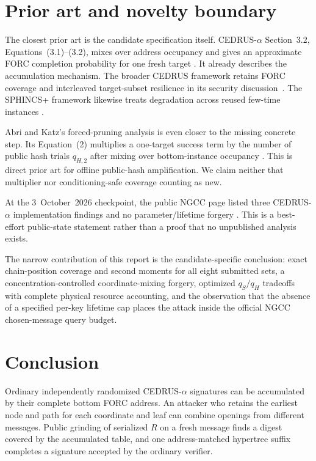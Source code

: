 \documentclass[11pt,a4paper]{article}
\begin{document}
\section{Prior art and novelty boundary}

The closest prior art is the candidate specification itself.  CEDRUS-$\alpha$
Section~3.2, Equations~(3.1)--(3.2), mixes over address occupancy and gives an
approximate FORC completion probability for one fresh target
\cite{cedrus-spec}.  It already describes the accumulation mechanism.  The
broader CEDRUS framework retains FORC coverage and interleaved target-subset
resilience in its security discussion~\cite{cedrus-framework}.  The SPHINCS+
framework likewise treats degradation across reused few-time instances
\cite{sphincs-framework}.

Abri and Katz's forced-pruning analysis is even closer to the missing concrete
step.  Its Equation~(2) multiplies a one-target success term by the number of
public hash trials $q_{H,2}$ after mixing over bottom-instance occupancy
\cite{abri-katz}.  This is direct prior art for offline public-hash
amplification.  We claim neither that multiplier nor conditioning-safe
coverage counting as new.

At the 3~October~2026 checkpoint, the public NGCC page listed three
CEDRUS-$\alpha$ implementation findings and no parameter/lifetime forgery
\cite{ngcc-cedrus}.  This is a best-effort public-state statement rather than a
proof that no unpublished analysis exists.

The narrow contribution of this report is the candidate-specific conclusion:
exact chain-position coverage and second moments for all eight submitted sets,
a concentration-controlled coordinate-mixing forgery, optimized $q_S/q_H$
tradeoffs with complete physical resource accounting, and the observation that
the absence of a specified per-key lifetime cap places the attack inside the
official NGCC chosen-message query budget.

\section{Conclusion}

Ordinary independently randomized CEDRUS-$\alpha$ signatures can be accumulated
by their complete bottom FORC address.  An attacker who retains the earliest
node and path for each coordinate and leaf can combine openings from different
messages.  Public grinding of serialized $R$ on a fresh message finds a digest
covered by the accumulated table, and one address-matched hypertree suffix
completes a signature accepted by the ordinary verifier.
\end{document}
